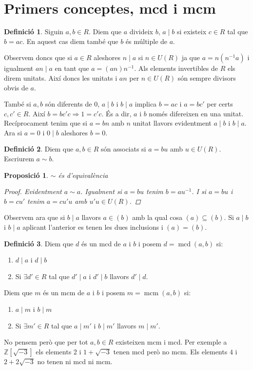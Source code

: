 \documentclass[a4paper,11pt]{report}
\newcommand{\inv}[1]{#1^{-1}}
\DeclareMathOperator{\mcd}{mcd}
\DeclareMathOperator{\mcm}{mcm}
\newcommand{\im}{\Rightarrow}
\theoremstyle{theorem}
\newtheorem{proposicio}{\normalfont \sffamily\bfseries Proposició}[section]
\theoremstyle{definition}
\newtheorem{definicio}{\normalfont\sffamily\bfseries Definició}[section]
\begin{document}
\section{Primers conceptes, mcd i mcm}
\begin{definicio}
	Siguin $a,b\in R$. Diem que $a$ divideix $b$, $a\mid b$ si existeix $c\in R$ tal que $b=ac$. En aquest cas diem també que $b$ és múltiple de $a$.
\end{definicio}

Observem doncs que si $a\in R$ aleshores $n\mid a$ si $n\in U(R)$ ja que $a=n(\inv{n}a)$ i igualment $an\mid a$ en tant que $a=(an)\inv{n}$.
Als elements invertibles de $R$ els direm unitats. Així doncs les unitats i $an$ per $n\in U(R)$ són sempre divisors obvis de $a$.

També si $a,b$ són diferents de 0, $a\mid b$ i $b\mid a$ implica $b=ac$ i $a=bc'$ per certs $c,c'\in R$. Així $b=bc'c\im 1=c'c$. És a dir, $a$ i $b$ només difereixen en una unitat. Recíprocament tenim que si $a=bn$ amb $n$ unitat llavors evidentment $a\mid b$ i $b\mid a$. Ara si $a=0$ i $0\mid b$ aleshores $b=0$.

\begin{definicio}
	Diem que $a,b\in R$ són associats si $a=bu$ amb $u\in U(R)$. Escriurem $a\sim b$.
\end{definicio}

\begin{proposicio}
	$\sim$ és d'equivalència
	\begin{proof}
		Evidentment $a\sim a$. Igualment si $a=bu$ tenim $b=a\inv{u}$. I si $a=bu$ i $b=cu'$ tenim $a=cu'u$ amb $u'u\in U(R)$.
	\end{proof}
\end{proposicio}
Observem ara que si $b\mid a$ llavors $a\in (b)$ amb la qual cosa $(a)\subseteq (b)$. Si $a\mid b$ i $b\mid a$ aplicant l'anterior es tenen les dues inclusions i $(a)=(b)$.
\begin{definicio}
	Diem que $d$ és un mcd de $a$ i $b$ i posem $d=\mcd(a,b)$ si:\begin{enumerate}
		\item $d\mid a$ i $d\mid b$
		\item Si $\exists d'\in R$ tal que $d'\mid a$ i $d'\mid b$ llavors $d'\mid d$.
	\end{enumerate}
Diem que $m$ és un mcm de $a$ i $b$ i posem $m=\mcm(a,b)$ si:
\begin{enumerate}
	\item $a\mid m$ i $b\mid m$\item Si $\exists m'\in R$ tal que $a\mid m'$ i $b\mid m'$ llavors $m\mid m'$.
\end{enumerate}
\end{definicio}
No pensem però que per tot $a,b\in R$ existeixen mcm i mcd. Per exemple a $\mathbb{Z}[\sqrt{-3}]$ els elements 2 i $1+\sqrt{-3}$ tenen mcd però no mcm. Els elements $4$ i $2+2\sqrt{-3}$ no tenen ni mcd ni mcm.
\end{document}

